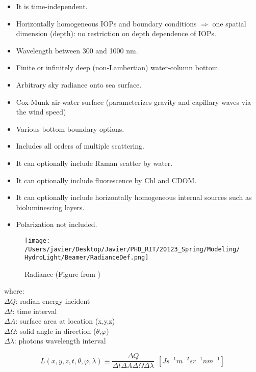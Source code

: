 \begin{itemize}
	\item It is time-independent.
	\item Horizontally homogeneous IOPs and boundary conditions $\Rightarrow$ one spatial dimension (depth): no restriction on depth dependence of IOPs.
	\item Wavelength between 300 and 1000 nm.
	\item Finite or infinitely deep (non-Lambertian) water-column bottom.
	\item Arbitrary sky radiance onto sea surface.
	\item Cox-Munk air-water surface (parameterizes gravity and capillary waves via the wind speed)
	\item Various bottom boundary options.
	\item Includes all orders of multiple scattering.
	\item It can optionally include Raman scatter by water.
	\item It can optionally include fluorescence by Chl and CDOM.
	\item It can optionally include horizontally homogeneous internal sources such as bioluminescing layers.
	\item Polarization not included.
\end{itemize}

\begin{figure}[H]
	\centering
	\texttt{[image: /Users/javier/Desktop/Javier/PHD\_RIT/20123\_Spring/Modeling/HydroLight/Beamer/RadianceDef.png]}
\caption{Radiance (Figure from \cite{Mobley:2001}) \label{fig:radiance} } 
\end{figure}
where:\\
			\noindent $\Delta Q$: radian energy incident \\
			$\Delta t$: time interval \\
			$\Delta A$: surface area at location (x,y,z)\\
			$\Delta\Omega$: solid angle in direction ($\theta$,$\varphi$) \\
			$\Delta\lambda$: photons wavelength interval

\begin{equation}
	L(x,y,z,t,\theta,\varphi,\lambda)\equiv\frac{\Delta Q}{\Delta t\Delta A\Delta\Omega\Delta\lambda}~~\left[ Js^{-1}m^{-2}sr^{-1}nm^{-1} \right]
\end{equation}

